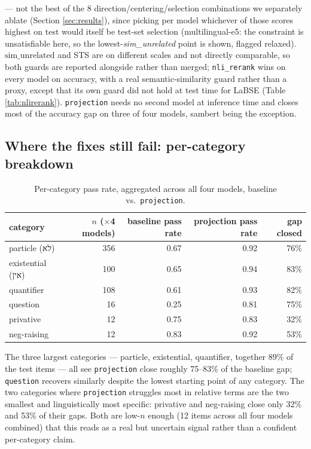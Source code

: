 \documentclass{article}
\newcommand{\heb}[1]{{\hebrewfont #1}}
\begin{document}
\begin{table}[h]
{--- not the best of the 8 direction/centering/selection combinations we
separately ablate (Section \ref{sec:results}), since picking per model
whichever of those scores highest on test would itself be test-set
selection (multilingual-e5: the constraint is unsatisfiable here, so the
lowest-\emph{sim\_unrelated} point is shown, flagged relaxed).
$\mathrm{sim\_unrelated}$ and STS are on different scales and not directly
comparable, so both guards are reported alongside rather than merged;
\texttt{nli\_rerank} wins on every model on accuracy, with a real
semantic-similarity guard rather than a proxy, except that its own guard
did not hold at test time for LaBSE (Table \ref{tab:nlirerank}).
\texttt{projection} needs no second model at inference time and closes
most of the accuracy gap on three of four models, sambert being the
exception.}
\label{tab:headtohead}
\end{table}

\subsection{Where the fixes still fail: per-category breakdown}

\begin{table}[h]
\centering
\small
\begin{tabular}{lrrrr}
\toprule
category & $n$ ($\times$4 models) & baseline pass rate & projection pass rate & gap closed \\
\midrule
particle (\heb{לא}) & 356 & 0.67 & 0.92 & 76\% \\
existential (\heb{אין}) & 100 & 0.65 & 0.94 & 83\% \\
quantifier & 108 & 0.61 & 0.93 & 82\% \\
question & 16 & 0.25 & 0.81 & 75\% \\
privative & 12 & 0.75 & 0.83 & 32\% \\
neg-raising & 12 & 0.83 & 0.92 & 53\% \\
\bottomrule
\end{tabular}
\caption{Per-category pass rate, aggregated across all four models,
baseline vs.\ \texttt{projection}.}
\label{tab:percategory}
\end{table}

The three largest categories --- particle, existential, quantifier,
together 89\% of the test items --- all see \texttt{projection} close
roughly 75--83\% of the baseline gap; \texttt{question} recovers similarly
despite the lowest starting point of any category. The two categories
where \texttt{projection} struggles most in relative terms are the two
smallest and linguistically most specific: privative and neg-raising close
only 32\% and 53\% of their gaps. Both are low-$n$ enough (12 items across
all four models combined) that this reads as a real but uncertain signal
rather than a confident per-category claim.
\end{document}
